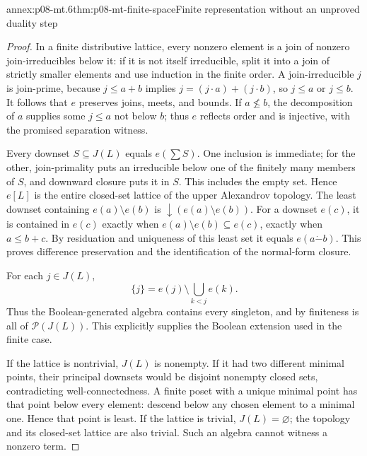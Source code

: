 \begin{annexitem}{annex:p08-mt.6}{thm:p08-mt-finite-space}{Finite representation without an unproved duality step}
\begin{proof}
In a finite distributive lattice, every nonzero element is a join of
nonzero join-irreducibles below it: if it is not itself irreducible,
split it into a join of strictly smaller elements and use induction in
the finite order. A join-irreducible \(j\) is join-prime, because
\(j\leq a+b\) implies
\(j=(j\cdot a)+(j\cdot b)\), so \(j\leq a\) or \(j\leq b\).
It follows that \(e\) preserves joins, meets, and bounds. If
\(a\not\leq b\), the decomposition of \(a\) supplies some
\(j\leq a\) not below \(b\); thus \(e\) reflects order and is
injective, with the promised separation witness.

Every downset \(S\subseteq J(L)\) equals \(e(\sum S)\). One inclusion
is immediate; for the other, join-primality puts an irreducible below
one of the finitely many members of \(S\), and downward closure puts
it in \(S\). This includes the empty set. Hence \(e[L]\) is the
entire closed-set lattice of the upper Alexandrov topology.
The least downset containing \(e(a)\setminus e(b)\) is
\(\downarrow(e(a)\setminus e(b))\). For a downset \(e(c)\), it is
contained in \(e(c)\) exactly when
\(e(a)\setminus e(b)\subseteq e(c)\), exactly when \(a\leq b+c\).
By residuation and uniqueness of this least set it equals
\(e(a\mathbin{\dot{-}}b)\). This proves difference preservation
and the identification of the normal-form closure.

For each \(j\in J(L)\),
\[
 \{j\}=e(j)\setminus\bigcup_{k<j}e(k).
\]
Thus the Boolean-generated algebra contains every singleton, and by
finiteness is all of \(\mathcal P(J(L))\). This explicitly supplies
the Boolean extension used in the finite case.

If the lattice is nontrivial, \(J(L)\) is nonempty. If it had two
different minimal points, their principal downsets would be disjoint
nonempty closed sets, contradicting well-connectedness. A finite poset
with a unique minimal point has that point below every element: descend
below any chosen element to a minimal one. Hence that point is least.
If the lattice is trivial, \(J(L)=\varnothing\); the topology and its
closed-set lattice are also trivial. Such an algebra cannot witness
a nonzero term.
\end{proof}
\end{annexitem}

